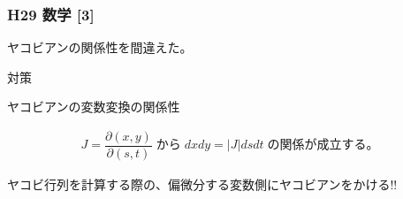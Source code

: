 \documentclass[a4paper]{jsarticle}
\begin{document}
\subsubsection{H29 数学 [3]}
ヤコビアンの関係性を間違えた。
\begin{itembox}[l]{対策}
    \begin{center}
        ヤコビアンの変数変換の関係性
    \end{center}
    \begin{eqnarray*}
        J=\dfrac{\partial \left(x,y\right)}{\partial \left(s,t\right)}\; から\; dxdy=|J|dsdt\; の関係が成立する。
    \end{eqnarray*}
    \begin{center}
        ヤコビ行列を計算する際の、偏微分する変数側にヤコビアンをかける!!
    \end{center}
\end{itembox}
\end{document}
